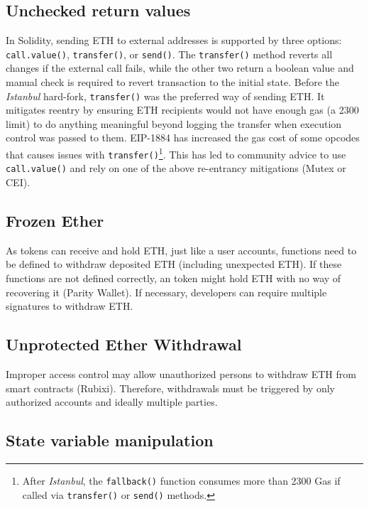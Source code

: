 \subsection{Unchecked return values}\label{subsec:urv}
In Solidity, sending ETH to external addresses is supported by three options: \texttt{call.value()}, \texttt{transfer()}, or \texttt{send()}. The \texttt{transfer()} method reverts all changes if the external call fails, while the other two return a boolean value and manual check is required to revert transaction to the initial state\cite{SoliditySendEther}. Before the \textit{Istanbul} hard-fork\cite{IstanbulUpgrades}, \texttt{transfer()} was the preferred way of sending ETH. It mitigates reentry by ensuring ETH recipients would not have enough gas (\ie a 2300 limit) to do anything meaningful beyond logging the transfer when execution control was passed to them. EIP-1884\cite{EIP1884} has increased the gas cost of some opcodes that causes issues with \texttt{transfer()}\footnote{After \textit{Istanbul}, the \texttt{fallback()} function consumes more than 2300 Gas if called via \texttt{transfer()} or \texttt{send()} methods.}. This has led to community advice to use \texttt{call.value()} and rely on one of the above re-entrancy mitigations (\ie Mutex or CEI)\cite{ConsensysStopTran,ChainSecurity}.

\subsection{Frozen Ether}\label{subsec:feth}

As \erc tokens can receive and hold ETH, just like a user accounts, functions need to be defined to withdraw deposited ETH (including unexpected ETH). If these functions are not defined correctly, an \erc token might hold ETH with no way of recovering it (\cf Parity Wallet\cite{ParityWalletHack}). If necessary, developers can require multiple signatures to withdraw ETH.

\subsection{Unprotected Ether Withdrawal}\label{subsec:uew}

Improper access control may allow unauthorized persons to withdraw ETH from smart contracts (\cf Rubixi\cite{Rubixi}). Therefore, withdrawals must be triggered by only authorized accounts and ideally multiple parties.

\subsection{State variable manipulation}\label{subsec:svm}

